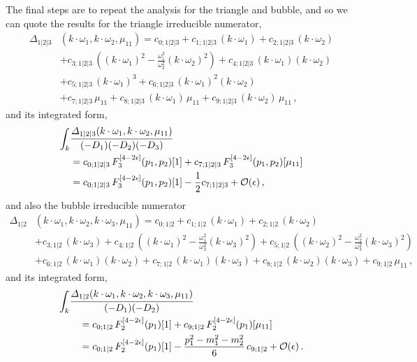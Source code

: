 The final steps are to repeat the analysis for the triangle and bubble, and so we can quote the results for the triangle irreducible numerator,
\begin{align}
  \Delta_{1|2|3}&(k\cdot\omega_1, k\cdot\omega_2, \mu_{11}) = c_{0;1|2|3}
  + c_{1;1|2|3} \, (k\cdot\omega_1) 
  + c_{2;1|2|3} \, (k\cdot\omega_2) \nonumber\\& 
  + c_{3;1|2|3} \, \left((k\cdot\omega_1)^2 - \frac{\omega_1^2}{\omega_2^2} (k\cdot\omega_2)^2 \right)
  + c_{4;1|2|3} \, (k\cdot\omega_1) (k\cdot\omega_2) \nonumber\\& 
  + c_{5;1|2|3} \, (k\cdot\omega_1)^3
  + c_{6;1|2|3} \, (k\cdot\omega_1)^2 (k\cdot\omega_2)\nonumber\\&
  + c_{7;1|2|3} \, \mu_{11} 
  + c_{8;1|2|3} \, (k\cdot\omega_1) \, \mu_{11} 
  + c_{9;1|2|3} \, (k\cdot\omega_2) \, \mu_{11} \,,
  \label{eq:triparamD}
\end{align}
and its integrated form,
\begin{align}
  \int_k &\frac{\Delta_{1|2|3}(k\cdot\omega_1, k\cdot\omega_2, \mu_{11})}{(-D_1) (-D_2) (-D_3)} \nonumber\\& =
      c_{0;1|2|3} \, F^{[4-2\eps]}_3(p_1,p_2)[1]
    + c_{7;1|2|3} \, F^{[4-2\eps]}_3(p_1,p_2)[\mu_{11}] \nonumber\\&
    = 
    c_{0;1|2|3} \, F^{[4-2\eps]}_3(p_1,p_2)[1] - \frac{1}{2} c_{7;1|2|3} + \mathcal{O}(\eps) \,,
\end{align}
and also the bubble irreducible numerator
\begin{align}
  \Delta_{1|2}&(k\cdot\omega_1, k\cdot\omega_2, k\cdot\omega_3, \mu_{11}) = c_{0;1|2}
  + c_{1;1|2} \, (k\cdot\omega_1) 
  + c_{2;1|2} \, (k\cdot\omega_2) \nonumber\\& 
  + c_{3;1|2} \, (k\cdot\omega_3) 
  + c_{4;1|2} \, \left((k\cdot\omega_1)^2 - \frac{\omega_1^2}{\omega_3^2} (k\cdot\omega_3)^2 \right)
  + c_{5;1|2} \, \left((k\cdot\omega_2)^2 - \frac{\omega_2^2}{\omega_3^2} (k\cdot\omega_3)^2 \right) \nonumber\\&
  + c_{6;1|2} \, (k\cdot\omega_1) (k\cdot\omega_2) 
  + c_{7;1|2} \, (k\cdot\omega_1) (k\cdot\omega_3) 
  + c_{8;1|2} \, (k\cdot\omega_2) (k\cdot\omega_3) 
  + c_{9;1|2} \, \mu_{11} \,,
  \label{eq:bubparamD}
\end{align}
and its integrated form,
\begin{align}
  \int_k &\frac{\Delta_{1|2}(k\cdot\omega_1, k\cdot\omega_2, k\cdot\omega_3, \mu_{11})}{(-D_1) (-D_2)} \nonumber\\
  & \quad =
      c_{0;1|2} \, F^{[4-2\eps]}_2(p_1)[1]
    + c_{9;1|2} \, F^{[4-2\eps]}_2(p_1)[\mu_{11}] \nonumber\\
    & \quad = 
    c_{0;1|2} \, F^{[4-2\eps]}_2(p_1)[1] - \frac{p_1^2-m_1^2-m_2^2}{6} \, c_{9;1|2} + \mathcal{O}(\eps) \,.
\end{align}
